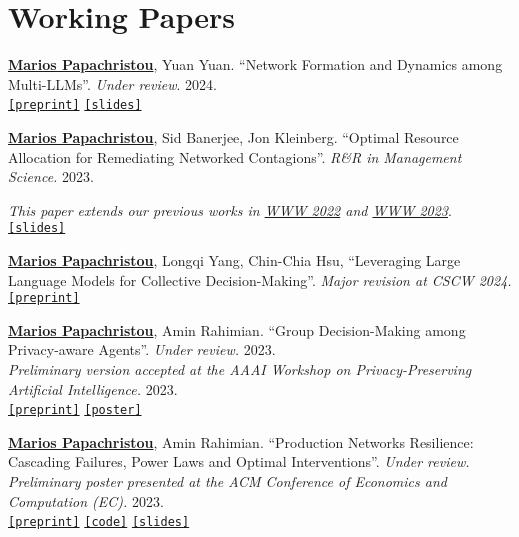 \documentclass[margin]{res}
\newcommand{\specialurl}[2]{\href {#2} {\texttt{[#1]}}}
\newcommand{\preprint}[1]{\specialurl {preprint} {#1}}
\newcommand{\code}[1]{\specialurl {code} {#1}}
\newcommand{\slides}[1]{\specialurl {slides} {#1}}
\newcommand{\poster}[1]{\specialurl {poster} {#1}}
\newcommand{\authorref}[1]{\underline {\textbf{#1}}}
\newcommand{\authorme}{\authorref{Marios Papachristou}}
\begin{document}
\begin{resume}
\begin{enumerate}[nosep, label={[P\arabic*]}]
\end{enumerate}

\section{Working Papers}


\begin{enumerate}[nosep, label={[W\arabic*]}]  
   \item \authorme, Yuan Yuan. ``Network Formation and Dynamics among Multi-LLMs''. \emph{Under review}. 2024. \\
   		\preprint{http://arxiv.org/abs/2402.10659} \slides{https://drive.google.com/file/d/13Qm_82D0WrkmN1LAv2AUmjcputMOdm_y/view?usp=drive_link}

   \item \authorme, Sid Banerjee, Jon Kleinberg. ``Optimal Resource Allocation for Remediating Networked Contagions''. \emph{R\&R in Management Science.} 2023.
   
   \emph{This paper extends our previous works in \href{https://doi.org/10.1145/3485447.3512047}{WWW 2022} and \href{https://arxiv.org/abs/2205.13394}{WWW 2023}}. \\
       \slides{https://drive.google.com/file/d/1DgOCnJ5Pf3Je-F7a-Adiy2TTZ7oZUbbB/view?usp=sharing}

   \item \authorme, Longqi Yang, Chin-Chia Hsu, ``Leveraging Large Language Models for Collective Decision-Making''. \emph{Major revision at CSCW 2024.} \\
  	\preprint{https://arxiv.org/abs/2311.04928}

   \item \authorme, Amin Rahimian. ``Group Decision-Making among Privacy-aware Agents''. \emph{Under review.} 2023. \\
  	\emph{Preliminary version accepted at the AAAI Workshop on Privacy-Preserving Artificial Intelligence.} 2023. \\
  		\preprint{https://arxiv.org/pdf/2402.08156.pdf} \poster{https://drive.google.com/file/d/149A7tdByRdOGHo_Xa_9H55qxExtESVhJ/view?usp=drive_link}
   	   
   \item \authorme, Amin Rahimian. ``Production Networks Resilience: Cascading Failures, Power Laws and Optimal Interventions''. \emph{Under review.} 
   		\emph{Preliminary poster presented at the ACM Conference of Economics and Computation (EC).} 2023. \\ \preprint{https://papers.ssrn.com/sol3/papers.cfm?abstract_id=4392226} \code{https://github.com/papachristoumarios/supply-chain-resilience} \slides{https://drive.google.com/file/d/13kgKnjTHyO8j4BOJVykWwt43hSt3JrLw/view?usp=drive_link}
 

\end{enumerate}
\end{resume}
\end{document}
